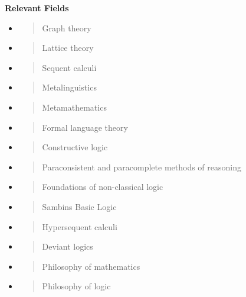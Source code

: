 \textbf{Relevant Fields}

\begin{itemize}
\item
  \begin{quote}
  Graph theory
  \end{quote}
\item
  \begin{quote}
  Lattice theory
  \end{quote}
\item
  \begin{quote}
  Sequent calculi
  \end{quote}
\item
  \begin{quote}
  Metalinguistics
  \end{quote}
\item
  \begin{quote}
  Metamathematics
  \end{quote}
\item
  \begin{quote}
  Formal language theory
  \end{quote}
\item
  \begin{quote}
  Constructive logic
  \end{quote}
\item
  \begin{quote}
  Paraconsistent and paracomplete methods of reasoning
  \end{quote}
\item
  \begin{quote}
  Foundations of non-classical logic
  \end{quote}
\item
  \begin{quote}
  Sambin\textquotesingle s Basic Logic
  \end{quote}
\item
  \begin{quote}
  Hypersequent calculi
  \end{quote}
\item
  \begin{quote}
  Deviant logics
  \end{quote}
\item
  \begin{quote}
  Philosophy of mathematics
  \end{quote}
\item
  \begin{quote}
  Philosophy of logic

\end{quote}
\end{itemize}
